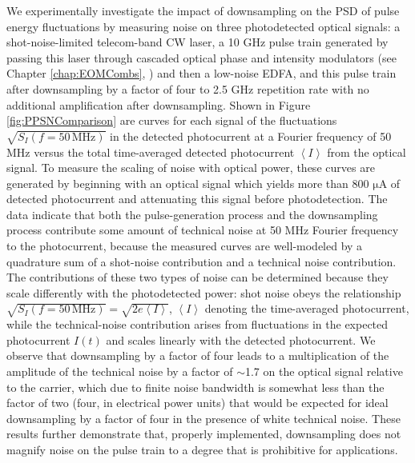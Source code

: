 We experimentally investigate the impact of downsampling on the PSD of pulse energy fluctuations by measuring noise on three photodetected optical signals: a shot-noise-limited telecom-band CW laser, a 10 GHz pulse train generated by passing this laser through cascaded optical phase and intensity modulators (see Chapter \ref{chap:EOMCombs}, \cite{Cole2016}) and then a low-noise EDFA, and this pulse train after downsampling by a factor of four to 2.5 GHz repetition rate with no additional amplification after downsampling. Shown in Figure \ref{fig:PPSNComparison} are curves for each signal of the fluctuations $\sqrt{S_I (f=50\, \mathrm{MHz})}$ in the detected photocurrent at a Fourier frequency of 50 MHz versus the total time-averaged detected photocurrent $\left<I\right>$ from the optical signal. To measure the scaling of noise with optical power, these curves are generated by beginning with an optical signal which yields more than 800 $\mathrm{\mu}$A of detected photocurrent and attenuating this signal before photodetection. The data indicate that both the pulse-generation process and the downsampling process contribute some amount of technical noise at 50 MHz Fourier frequency to the photocurrent, because the measured curves are well-modeled by a quadrature sum of a shot-noise contribution and a technical noise contribution. The contributions of these two types of noise can be determined because they scale differently with the photodetected power: shot noise obeys the relationship  $\sqrt{S_I (f=50\, \mathrm{MHz})}=\sqrt{2e\left<I\right>}$, $\left<I\right>$ denoting the time-averaged photocurrent, while the technical-noise contribution arises from fluctuations in the expected photocurrent $I(t)$  and scales linearly with the detected photocurrent. We observe that downsampling by a factor of four leads to a multiplication of the amplitude of the technical noise by a factor of $\sim$1.7 on the optical signal relative to the carrier, which due to finite noise bandwidth is somewhat less than the factor of two (four, in electrical power units) that would be expected for ideal downsampling by a factor of four in the presence of white technical noise. These results further demonstrate that, properly implemented, downsampling does not magnify noise on the pulse train to a degree that is prohibitive for applications.

